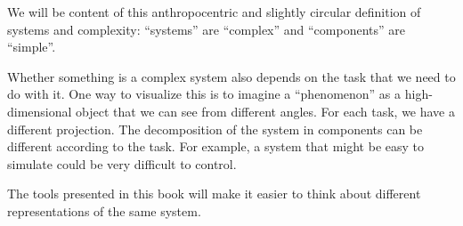 We will be content of this anthropocentric and slightly circular definition of systems and complexity: ``systems'' are ``complex'' and ``components'' are ``simple''.

Whether something is a complex system also depends on the task that we need to do with it.
One way to visualize this is to imagine a ``phenomenon'' as a high-dimensional object that we can see from different angles.
For each task, we have a different projection.
The decomposition of the system in components can be different according to the task.
For example, a system that might be easy to simulate could be very difficult to control.



The tools presented in this book will make it easier to think about different representations of the same system.






